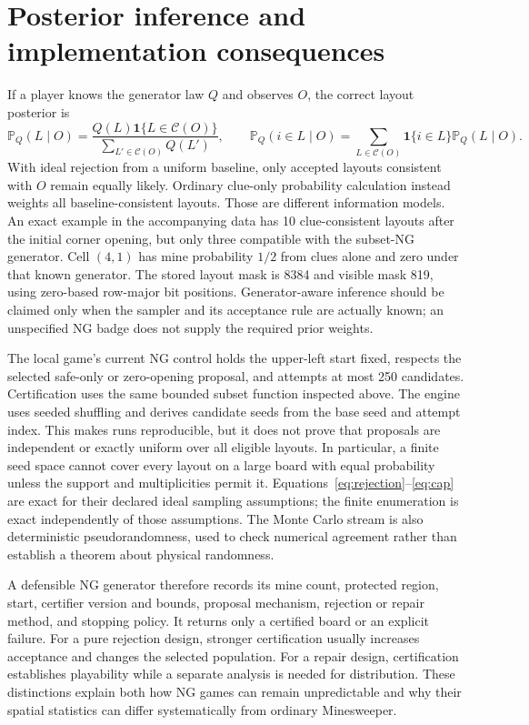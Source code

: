 \documentclass[11pt]{article}
\newcommand{\Prb}{\mathbb P}
\newcommand{\ind}{\mathbf 1}
\begin{document}
\section{Posterior inference and implementation consequences}

If a player knows the generator law $Q$ and observes $O$, the correct layout posterior is
\begin{equation}
 \Prb_Q(L\mid O)=\frac{Q(L)\ind\{L\in\mathcal C(O)\}}{\sum_{L'\in\mathcal C(O)}Q(L')},\qquad
 \Prb_Q(i\in L\mid O)=\sum_{L\in\mathcal C(O)}\ind\{i\in L\}\Prb_Q(L\mid O).
 \label{eq:posterior}
\end{equation}
With ideal rejection from a uniform baseline, only accepted layouts consistent with $O$ remain equally likely. Ordinary clue-only probability calculation instead weights all baseline-consistent layouts. Those are different information models. An exact example in the accompanying data has 10 clue-consistent layouts after the initial corner opening, but only three compatible with the subset-NG generator. Cell $(4,1)$ has mine probability $1/2$ from clues alone and zero under that known generator. The stored layout mask is 8384 and visible mask 819, using zero-based row-major bit positions. Generator-aware inference should be claimed only when the sampler and its acceptance rule are actually known; an unspecified NG badge does not supply the required prior weights.

The local game's current NG control holds the upper-left start fixed, respects the selected safe-only or zero-opening proposal, and attempts at most 250 candidates. Certification uses the same bounded subset function inspected above. The engine uses seeded shuffling and derives candidate seeds from the base seed and attempt index. This makes runs reproducible, but it does not prove that proposals are independent or exactly uniform over all eligible layouts. In particular, a finite seed space cannot cover every layout on a large board with equal probability unless the support and multiplicities permit it. Equations~\eqref{eq:rejection}--\eqref{eq:cap} are exact for their declared ideal sampling assumptions; the finite enumeration is exact independently of those assumptions. The Monte Carlo stream is also deterministic pseudorandomness, used to check numerical agreement rather than establish a theorem about physical randomness.

A defensible NG generator therefore records its mine count, protected region, start, certifier version and bounds, proposal mechanism, rejection or repair method, and stopping policy. It returns only a certified board or an explicit failure. For a pure rejection design, stronger certification usually increases acceptance and changes the selected population. For a repair design, certification establishes playability while a separate analysis is needed for distribution. These distinctions explain both how NG games can remain unpredictable and why their spatial statistics can differ systematically from ordinary Minesweeper.
\end{document}
